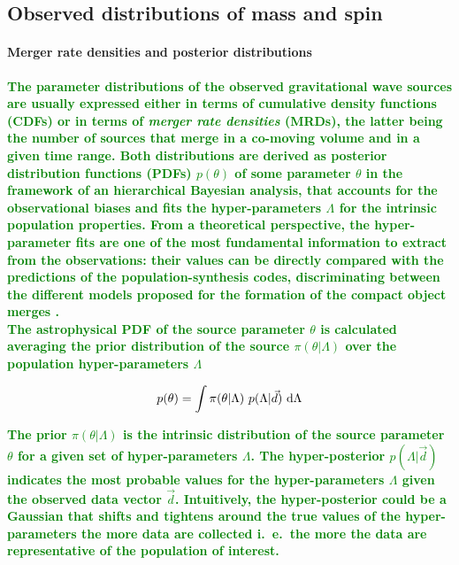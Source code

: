 \documentclass[a4paper,titlepage]{book}     	%
\newcommand{\erika}[1]{\textcolor{green}{\bf#1}}
\begin{document}
\subsection{Observed distributions of mass and spin}\label{subsec:GWmassspin}

\paragraph{Merger rate densities and posterior distributions}%
\erika{The parameter distributions of the observed gravitational wave sources are usually expressed either in terms of cumulative density functions (CDFs) or in terms of \emph{merger rate densities} (MRDs), the latter being the number of sources that merge in a co-moving volume and in a given time range. Both distributions are derived as posterior distribution functions (PDFs) $p(\theta)$ of some parameter $\theta$ in the framework of an hierarchical Bayesian analysis, that accounts for the observational biases and fits the hyper-parameters $\Lambda$ for the intrinsic population properties. From a theoretical perspective, the hyper-parameter fits are one of the most fundamental information to extract from the observations: their values can be directly compared with the predictions of the population-synthesis codes, discriminating between the different models proposed for the formation of the compact object merges \cite{GWTC-3_interpretation, BayesforGW}.} \\

\erika{The astrophysical PDF of the source parameter $\theta$ is calculated averaging the prior distribution of the source $\pi(\theta|\Lambda)$ over the population hyper-parameters $\Lambda$ }

\begin{equation}\label{eq:posteriorMRD}
    p(\theta) = \int \pi(\theta|\Lambda)~p(\Lambda|\vec{d})~\rm d \Lambda
\end{equation}

\erika{The prior $\pi(\theta|\Lambda)$ is the intrinsic distribution of the source parameter $\theta$ for a given set of hyper-parameters $\Lambda$. The hyper-posterior $p(\Lambda|\vec{d})$ indicates the most probable values for the hyper-parameters $\Lambda$ given the observed data vector $\vec{d}$. Intuitively, the hyper-posterior could be a Gaussian that shifts and tightens around the true values of the hyper-parameters the more data are collected i.\ e.\ the more the data are representative of the population of interest.}
\end{document}
